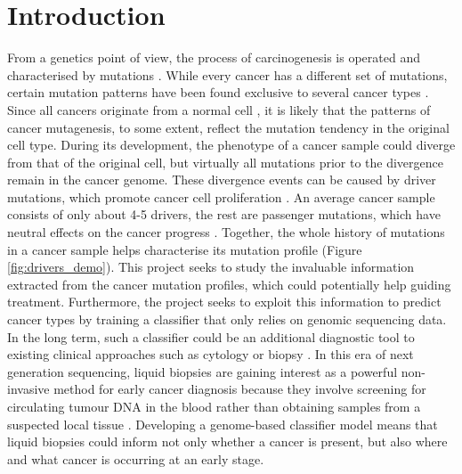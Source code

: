 \chapter{Introduction}\label{intro}

From a genetics point of view, the process of \gls{carcinogenesis} is operated and characterised by mutations \citep{Stratton2009}. While every cancer has a different set of mutations, certain mutation patterns have been found exclusive to several cancer types \citep{Alexandrov2013,Polak2015,Campbell2020}. Since all cancers originate from a normal cell \citep{Hanahan2011HallmarksGeneration}, it is likely that the patterns of cancer \gls{mutagenesis}, to some extent, reflect the mutation tendency in the original cell type. During its development, the phenotype of a cancer sample could diverge from that of the original cell, but virtually all mutations prior to the divergence remain in the cancer genome. These divergence events can be caused by driver mutations, which promote cancer cell proliferation \citep{Pon2015}. An average cancer sample consists of only about 4-5 drivers, the rest are passenger mutations, which have neutral effects on the cancer progress \citep{Campbell2020}. Together, the whole history of mutations in a cancer sample helps characterise its mutation profile (Figure \ref{fig:drivers_demo}). This project seeks to study the invaluable information extracted from the cancer mutation profiles, which could potentially help guiding treatment. Furthermore, the project seeks to exploit this information to predict cancer types by training a \gls{classifier} that only relies on genomic sequencing data. In the long term, such a classifier could be an additional diagnostic tool to existing clinical approaches such as cytology or biopsy \citep{Stone1995Biopsy:Pitfalls}. In this era of next generation sequencing, liquid biopsies are gaining interest as a powerful non-invasive method for early cancer diagnosis because they involve screening for circulating tumour DNA in the blood rather than obtaining samples from a suspected local tissue \citep{Chen2019Next-generationDetection}. Developing a genome-based classifier model means that liquid biopsies could inform not only whether a cancer is present, but also where and what cancer is occurring at an early stage.  

